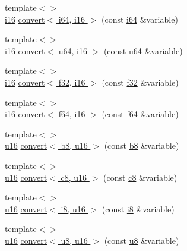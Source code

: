 \begin{DoxyCompactItemize}
\item 
{\footnotesize template$<$$>$ }\\\hyperlink{types_8h_ad309dbcaeea13aa602d686964156ea0b}{i16} \hyperlink{namespacecrap_a255a70e8de7d9dc6ef788044415eddcc}{convert$<$ i64, i16 $>$} (const \hyperlink{types_8h_a85cb35fbe5bf2961d7ad5f26814a91a2}{i64} \&variable)
\item 
{\footnotesize template$<$$>$ }\\\hyperlink{types_8h_ad309dbcaeea13aa602d686964156ea0b}{i16} \hyperlink{namespacecrap_a4768cb209d7b9607ddb4d8b76e10e7cc}{convert$<$ u64, i16 $>$} (const \hyperlink{types_8h_a3f7e2bcbb0b4c338f3c4f6c937cd4234}{u64} \&variable)
\item 
{\footnotesize template$<$$>$ }\\\hyperlink{types_8h_ad309dbcaeea13aa602d686964156ea0b}{i16} \hyperlink{namespacecrap_a96f2bb96926d24284b1a5fbee66d0b9e}{convert$<$ f32, i16 $>$} (const \hyperlink{types_8h_a154db6eda6a99565cb060a1da4b4c930}{f32} \&variable)
\item 
{\footnotesize template$<$$>$ }\\\hyperlink{types_8h_ad309dbcaeea13aa602d686964156ea0b}{i16} \hyperlink{namespacecrap_af5ebfae4e58ded206f8a22c157c106b2}{convert$<$ f64, i16 $>$} (const \hyperlink{types_8h_a76c9f53497f766e57b184bc8a93ab73f}{f64} \&variable)
\item 
{\footnotesize template$<$$>$ }\\\hyperlink{types_8h_ace9d960e74685e2cd84b36132dbbf8aa}{u16} \hyperlink{namespacecrap_a9203559ca9fd909cd9b02f290309f6e6}{convert$<$ b8, u16 $>$} (const \hyperlink{types_8h_a74eb47b4ab9e428eab7b91b3b877fa6c}{b8} \&variable)
\item 
{\footnotesize template$<$$>$ }\\\hyperlink{types_8h_ace9d960e74685e2cd84b36132dbbf8aa}{u16} \hyperlink{namespacecrap_ae11c91af0a5eb1a57c26cde878b7eae8}{convert$<$ c8, u16 $>$} (const \hyperlink{types_8h_aa1ba8aac9fcd831012308297336ac74b}{c8} \&variable)
\item 
{\footnotesize template$<$$>$ }\\\hyperlink{types_8h_ace9d960e74685e2cd84b36132dbbf8aa}{u16} \hyperlink{namespacecrap_a6a9972285249d0bacd423d98aa7e6b95}{convert$<$ i8, u16 $>$} (const \hyperlink{types_8h_ae3702327b5f47e83b431e22b33da7b58}{i8} \&variable)
\item 
{\footnotesize template$<$$>$ }\\\hyperlink{types_8h_ace9d960e74685e2cd84b36132dbbf8aa}{u16} \hyperlink{namespacecrap_a103ef6c00b8cc7b1061767f11f9aa654}{convert$<$ u8, u16 $>$} (const \hyperlink{types_8h_a92c50087ca0e64fa93fc59402c55f8ca}{u8} \&variable)

\end{DoxyCompactItemize}
